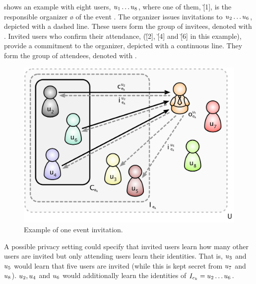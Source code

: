  shows an example with eight users, $\u[1] \dots \u[8]$, where one 
of them, \u[1], is the responsible organizer \o{} of the event \e{}. 
The organizer issues invitations to $\u[2] \dots \u[6]$, depicted with 
a dashed line. These users form the group of invitees, denoted with \I.
Invited users who confirm their attendance, (\u[2], \u[4] and \u[6] in
this example), provide a commitment to the organizer, depicted with a
continuous line. They form the group of attendees, denoted with \C.

\begin{figure}
  \centering
  \includegraphics[width=.77\linewidth]{images/event-invitations-dosns/system-overview}
  \caption{Example of one event invitation.}
  \label{figure:event-invitations-dosns:system-overview}
\end{figure}

A possible privacy setting
could specify that invited users learn how many other users are invited
but only attending users learn their identities. That is, $\u[3]$
and $\u[5]$ would learn that five users are invited (while this is kept
secret from $\u[7]$ and $\u[8]$). $\u[2], \u[4]$ and $\u[6]$
would additionally learn the identities of $\I = \u[2] \dots \u[6]$.

